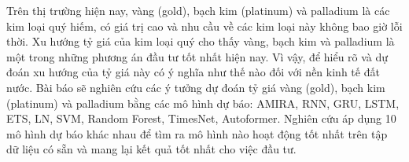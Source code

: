 Trên thị trường hiện nay, vàng (gold), bạch kim (platinum) và palladium là các kim loại quý hiếm, có giá trị cao và nhu cầu về các kim loại này không bao giờ lỗi thời. Xu hướng tỷ giá của kim loại quý cho thấy vàng, bạch kim và palladium là một trong những phương án đầu tư tốt nhất hiện nay. Vì vậy, để hiểu rõ và dự đoán xu hướng của tỷ giá này có ý nghĩa như thế nào đối với nền kinh tế đất nước. Bài báo sẽ nghiên cứu các ý tưởng dự đoán tỷ giá vàng (gold), bạch kim (platinum) và palladium bằng các mô hình dự báo: AMIRA, RNN, GRU, LSTM, ETS, LN, SVM, Random Forest, TimesNet, Autoformer. Nghiên cứu áp dụng 10 mô hình dự báo khác nhau để tìm ra mô hình nào hoạt động tốt nhất trên tập dữ liệu có sẵn và mang lại kết quả tốt nhất cho việc đầu tư.